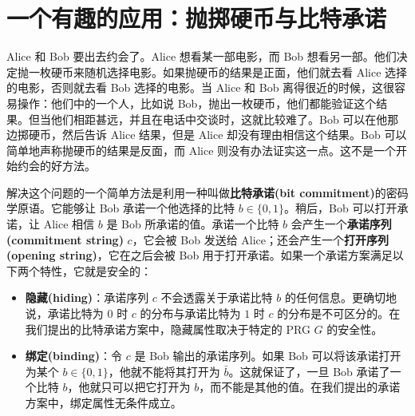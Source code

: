 \section{一个有趣的应用：抛掷硬币与比特承诺}\label{sec:3-12}

Alice 和 Bob 要出去约会了。Alice 想看某一部电影，而 Bob 想看另一部。他们决定抛一枚硬币来随机选择电影。如果抛硬币的结果是正面，他们就去看 Alice 选择的电影，否则就去看 Bob 选择的电影。当 Alice 和 Bob 离得很近的时候，这很容易操作：他们中的一个人，比如说 Bob，抛出一枚硬币，他们都能验证这个结果。但当他们相距甚远，并且在电话中交谈时，这就比较难了。Bob 可以在他那边掷硬币，然后告诉 Alice 结果，但是 Alice 却没有理由相信这个结果。Bob 可以简单地声称抛硬币的结果是反面，而 Alice 则没有办法证实这一点。这不是一个开始约会的好方法。

解决这个问题的一个简单方法是利用一种叫做\textbf{比特承诺(bit commitment)}的密码学原语。它能够让 Bob 承诺一个他选择的比特 $b\in\{0,1\}$。稍后，Bob 可以打开承诺，让 Alice 相信 $b$ 是 Bob 所承诺的值。承诺一个比特 $b$ 会产生一个\textbf{承诺序列(commitment string)} $c$，它会被 Bob 发送给 Alice；还会产生一个\textbf{打开序列(opening string)}，它在之后会被 Bob 用于打开承诺。如果一个承诺方案满足以下两个特性，它就是安全的：
\begin{itemize}
	\item \textbf{隐藏(hiding)}：承诺序列 $c$ 不会透露关于承诺比特 $b$ 的任何信息。更确切地说，承诺比特为 $0$ 时 $c$ 的分布与承诺比特为 $1$ 时 $c$ 的分布是不可区分的。在我们提出的比特承诺方案中，隐藏属性取决于特定的 PRG $G$ 的安全性。
	\item \textbf{绑定(binding)}：令 $c$ 是 Bob 输出的承诺序列。如果 Bob 可以将该承诺打开为某个 $b\in\{0,1\}$，他就不能将其打开为 $\bar{b}$。这就保证了，一旦 Bob 承诺了一个比特 $b$，他就只可以把它打开为 $b$，而不能是其他的值。在我们提出的承诺方案中，绑定属性无条件成立。
\end{itemize}

